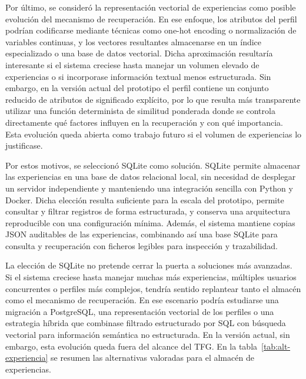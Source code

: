 \documentclass[12pt,a4paper]{article}
\theoremstyle{plain}
\begin{document}
Por último, se consideró la representación vectorial de experiencias como posible evolución del mecanismo de recuperación. En ese enfoque, los atributos del perfil podrían codificarse mediante técnicas como one-hot encoding o normalización de variables continuas, y los vectores resultantes almacenarse en un índice especializado o una base de datos vectorial. Dicha aproximación resultaría interesante si el sistema creciese hasta manejar un volumen elevado de experiencias o si incorporase información textual menos estructurada. Sin embargo, en la versión actual del prototipo el perfil contiene un conjunto reducido de atributos de significado explícito, por lo que resulta más transparente utilizar una función determinista de similitud ponderada donde se controla directamente qué factores influyen en la recuperación y con qué importancia. Esta evolución queda abierta como trabajo futuro si el volumen de experiencias lo justificase.

Por estos motivos, se seleccionó SQLite como solución. SQLite permite almacenar las experiencias en una base de datos relacional local, sin necesidad de desplegar un servidor independiente y manteniendo una integración sencilla con Python y Docker. Dicha elección resulta suficiente para la escala del prototipo, permite consultar y filtrar registros de forma estructurada, y conserva una arquitectura reproducible con una configuración mínima. Además, el sistema mantiene copias JSON auditables de las experiencias, combinando así una base SQLite para consulta y recuperación con ficheros legibles para inspección y trazabilidad.

La elección de SQLite no pretende cerrar la puerta a soluciones más avanzadas. Si el sistema creciese hasta manejar muchas más experiencias, múltiples usuarios concurrentes o perfiles más complejos, tendría sentido replantear tanto el almacén como el mecanismo de recuperación. En ese escenario podría estudiarse una migración a PostgreSQL, una representación vectorial de los perfiles o una estrategia híbrida que combinase filtrado estructurado por SQL con búsqueda vectorial para información semántica no estructurada. En la versión actual, sin embargo, esta evolución queda fuera del alcance del TFG. En la tabla~\ref{tab:alt-experiencia} se resumen las alternativas valoradas para el almacén de experiencias. %
\end{document}
